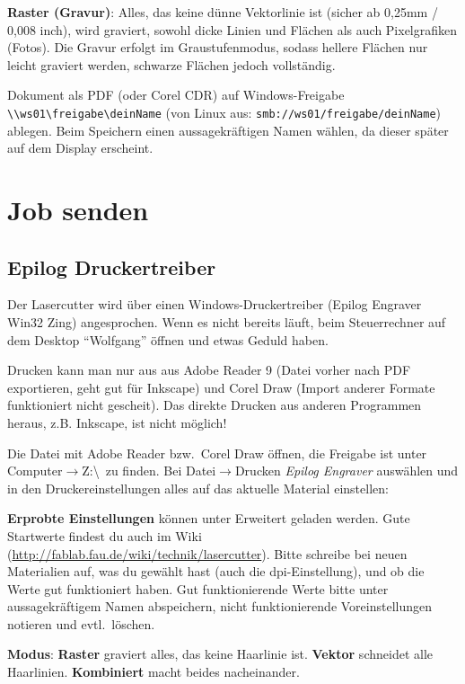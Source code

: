 \documentclass{\basedir/fablab-document}
\begin{document}
\textbf{Raster (Gravur)}: Alles, das keine dünne Vektorlinie ist (sicher ab 0,25mm / 0,008 inch), wird graviert, sowohl dicke Linien und Flächen als auch Pixelgrafiken (Fotos). Die Gravur erfolgt im Graustufenmodus, sodass hellere Flächen nur leicht graviert werden, schwarze Flächen jedoch vollständig.

Dokument als PDF (oder Corel CDR) auf Windows-Freigabe \texttt{\textbackslash\textbackslash ws01\textbackslash freigabe\textbackslash deinName} (von Linux aus: \texttt{smb://ws01/freigabe/deinName}) ablegen. Beim Speichern einen aussagekräftigen Namen wählen, da dieser später auf dem Display erscheint.

\section{Job senden}
\subsection{Epilog Druckertreiber}

Der Lasercutter wird über einen Windows-Druckertreiber (Epilog Engraver Win32 Zing) angesprochen. Wenn es nicht bereits läuft, beim Steuerrechner auf dem Desktop \enquote{Wolfgang} %
 öffnen und etwas Geduld haben.

Drucken kann man nur aus aus Adobe Reader 9 (Datei vorher nach PDF exportieren, geht gut für Inkscape) und Corel Draw (Import anderer Formate funktioniert nicht gescheit).  Das direkte Drucken aus anderen Programmen heraus, z.B. Inkscape, ist nicht möglich!

Die Datei mit Adobe Reader bzw.\  Corel Draw öffnen, die Freigabe ist unter Computer$\rightarrow$Z:\textbackslash \ zu finden. Bei Datei$\rightarrow$Drucken \textit{Epilog Engraver} auswählen und in den Druckereinstellungen alles auf das aktuelle Material einstellen:

\textbf{Erprobte Einstellungen} können unter Erweitert geladen werden. Gute Startwerte findest du auch im Wiki (\url{http://fablab.fau.de/wiki/technik/lasercutter}). Bitte schreibe bei neuen Materialien auf, was du gewählt hast (auch die dpi-Einstellung), und ob die Werte gut funktioniert haben. Gut funktionierende Werte bitte unter aussagekräftigem Namen abspeichern, nicht funktionierende Voreinstellungen notieren und evtl.\  löschen.

\textbf{Modus}: \textbf{Raster} graviert alles, das keine Haarlinie ist. \textbf{Vektor} schneidet alle Haarlinien. \textbf{Kombiniert} macht beides nacheinander.
\end{document}
